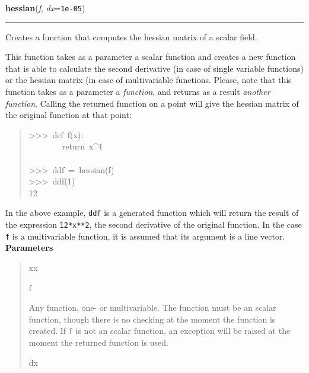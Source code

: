 \hspace{.8\funcindent}\begin{boxedminipage}{\funcwidth}

    \raggedright \textbf{hessian}(\textit{f}, \textit{dx}={\tt 1e-05})

    \vspace{-1.5ex}

    \rule{\textwidth}{0.5\fboxrule}
\setlength{\parskip}{2ex}

Creates a function that computes the hessian matrix of a scalar field.

This function takes as a parameter a scalar function and creates a new
function that is able to calculate the second derivative (in case of single
variable functions) or the hessian matrix (in case of multivariable
functions. Please, note that this function takes as a parameter a
\emph{function}, and returns as a result \emph{another function}. Calling the returned
function on a point will give the hessian matrix of the original function
at that point:
%
\begin{quote}{\ttfamily \raggedright \noindent
>{}>{}>~def~f(x):\\
~~~~~~~~return~x\textasciicircum{}4\\
~\\
>{}>{}>~ddf~=~hessian(f)\\
>{}>{}>~ddf(1)\\
12
}
\end{quote}

In the above example, \texttt{ddf} is a generated function which will return the
result of the expression \texttt{12*x**2}, the second derivative of the original
function. In the case \texttt{f} is a multivariable function, it is assumed that
its argument is a line vector.
\setlength{\parskip}{1ex}
      \textbf{Parameters}
      \vspace{-1ex}

      \begin{quote}
        \begin{Ventry}{xx}

          \item[f]


Any function, one- or multivariable. The function must be an scalar
function, though there is no checking at the moment the function is
created. If \texttt{f} is not an scalar function, an exception will be
raised at the moment the returned function is used.
          \item[dx]



\end{Ventry}
\end{quote}
\end{boxedminipage}
